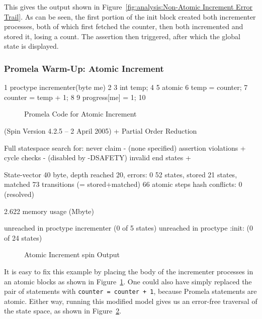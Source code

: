 This gives the output shown in
Figure~\ref{fig:analysis:Non-Atomic Increment Error Trail}.
As can be seen, the first portion of the init block created both
incrementer processes, both of which first fetched the counter,
then both incremented and stored it, losing a count.
The assertion then triggered, after which the global state is displayed.

\subsubsection{Promela Warm-Up: Atomic Increment}
\label{sec:formal:Promela Warm-Up: Atomic Increment}

{ \scriptsize
\begin{verbbox}
  1 proctype incrementer(byte me)
  2 {
  3   int temp;
  4
  5   atomic {
  6     temp = counter;
  7     counter = temp + 1;
  8   }
  9   progress[me] = 1;
 10 }
\end{verbbox}
}
\begin{figure}[htbp]
\centering
\theverbbox
\caption{Promela Code for Atomic Increment}
\label{fig:analysis:Promela Code for Atomic Increment}
\end{figure}

{ \scriptsize
\begin{verbbox}
(Spin Version 4.2.5 -- 2 April 2005)
        + Partial Order Reduction

Full statespace search for:
        never claim             - (none specified)
        assertion violations    +
        cycle checks            - (disabled by -DSAFETY)
        invalid end states      +

State-vector 40 byte, depth reached 20, errors: 0
      52 states, stored
      21 states, matched
      73 transitions (= stored+matched)
      66 atomic steps
hash conflicts: 0 (resolved)

2.622   memory usage (Mbyte)

unreached in proctype incrementer
        (0 of 5 states)
unreached in proctype :init:
        (0 of 24 states)
\end{verbbox}
}
\begin{figure}[htbp]
\centering
\theverbbox
\caption{Atomic Increment spin Output}
\label{fig:analysis:Atomic Increment spin Output}
\end{figure}

It is easy to fix this example by placing the body of the incrementer
processes in an atomic blocks as shown in
Figure~\ref{fig:analysis:Promela Code for Atomic Increment}.
One could also have simply replaced the pair of statements with
{\tt counter = counter + 1}, because Promela statements are
atomic.
Either way, running this modified model gives us an error-free traversal
of the state space, as shown in
Figure~\ref{fig:analysis:Atomic Increment spin Output}.

